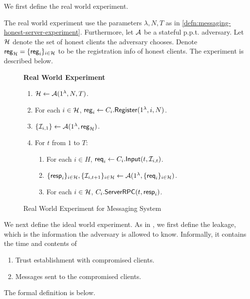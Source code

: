 We first define the real world experiment.

\begin{definition}
\label{defn:messaging-real-world-experiment}
The real world experiment use the parameters $\lambda, N, T$ as in \cref{defn:messaging-honest-server-experiment}. Furthermore, let $\mathcal{A}$ be a stateful p.p.t. adversary. Let $\mathcal{H}$ denote the set of honest clients the adversary chooses. Denote $\mathsf{reg}_{\mathcal{H}} = \{\mathsf{reg}_i\}_{i \in\mathcal{H}}$ to be the registration info of honest clients. The experiment is described below.
\end{definition}

\begin{figure}[!ht]
\begin{framed}
\textbf{Real World Experiment}
\begin{enumerate}
\item $\mathcal{H} \leftarrow \mathcal{A}(1^{\lambda}, N, T)$.
\item For each $i \in \mathcal{H}$, $\mathsf{reg}_i \leftarrow C_i.\mathsf{Register}(1^{\lambda}, i, N)$. 
\item $\{\mathcal{I}_{i, 1}\} \leftarrow \mathcal{A}(1^{\lambda}, \mathsf{reg}_{\mathcal{H}})$.
\item For $t$ from $1$ to $T$:
    \begin{enumerate}
    \item For each $i \in H$, $\mathsf{req}_i \leftarrow C_i.\mathsf{Input}(t, \mathcal{I}_{i, t})$.
    
    \item $\{\mathsf{resp}_i\}_{i \in \mathcal{H}}, \{\mathcal{I}_{i, t + 1}\}_{i \in \mathcal{H}} \leftarrow \mathcal{A}(1^{\lambda}, \{\mathsf{req}_i\}_{i \in \mathcal{H}})$.
    
    \item For each $i \in \mathcal{H}$, $C_i.\mathsf{ServerRPC}(t, \mathsf{resp}_i)$.
    \end{enumerate}
\end{enumerate}
\end{framed}
\label{expr:messaging-real-world}
\caption{Real World Experiment for Messaging System}
\end{figure}

We next define the ideal world experiment. As in \cite{shi2021non}, we first define the leakage, which is the information the adversary is allowed to know. Informally, it contains the time and contents of
\begin{enumerate}
    \item Trust establishment with compromised clients.
    \item Messages sent to the compromised clients.
\end{enumerate}
The formal definition is below.

